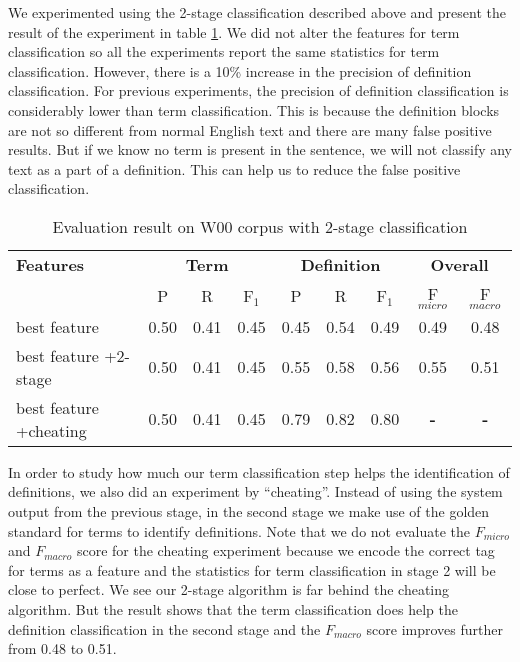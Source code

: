 \documentclass[hyp]{socreport}
\begin{document}
We experimented using the 2-stage classification described above and present the result of the experiment in table \ref{2stage}. We did not alter the features for term classification so all the experiments report the same statistics for term classification. However, there is a 10\% increase in the precision of definition classification. For previous experiments, the precision of definition classification is considerably lower than term classification. This is because the definition blocks are not so different from normal English text and there are many false positive results. But if we know no term is present in the sentence, we will not   classify any text as a part of a definition. This can help us to reduce the false positive classification.

\begin{table}
	
    \centering
\begin{tabular}{|p{3cm}|c|c|c|c|c|c|c|c|} 
\hline 
\bf{Features} & \multicolumn{3}{|c|}{\bf{Term}} & \multicolumn{3}{|c|}{\bf{Definition}} & \multicolumn{2}{|c|}{\bf{Overall}} \\ 
\cline{2-9} 
& P &R &F$_1$ & P &R &F$_1$ & F$_{micro}$ &F$_{macro}$\\ 
\hline 
best feature & 0.50 & 0.41 & 0.45 & 0.45 & 0.54 & 0.49 & 0.49 & 0.48 \\ \hline 
best feature \newline +2-stage & 0.50 & 0.41 & 0.45 & 0.55 & 0.58 & 0.56 & 0.55 & 0.51 \\ \hline 
best feature \newline +cheating & 0.50 & 0.41 & 0.45 & 0.79 & 0.82 & 0.80 & \bf{-} & \bf{-} \\ \hline 

    \end{tabular}
    \caption{Evaluation result on W00 corpus with 2-stage classification}
    \label{2stage}
\end{table}

In order to study how much our term classification step helps the identification of definitions, we also did an experiment by ``cheating''. Instead of using the system output from the previous stage, in the second stage we make use of the golden standard for terms to identify definitions. Note that we do not evaluate the $F_{micro}$ and $F_{macro}$ score for the cheating experiment because we encode the correct tag for terms as a feature and the statistics for term classification in stage 2 will be close to perfect. We see our 2-stage algorithm is far behind the cheating algorithm. But the result shows that the term classification does help the definition classification in the second stage and the $F_{macro}$ score improves further from 0.48 to 0.51. 
\end{document}
